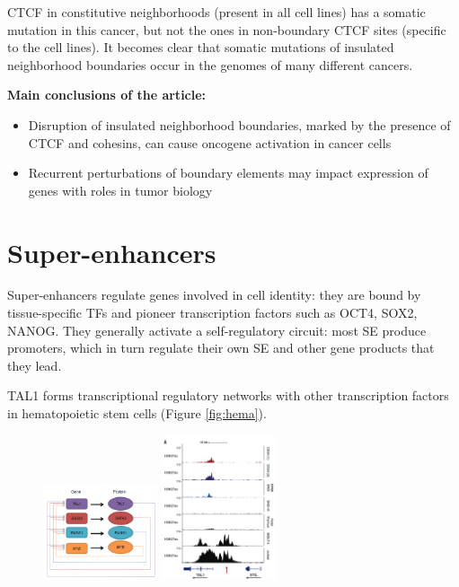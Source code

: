 CTCF in constitutive neighborhoods (present in all cell lines) has a somatic mutation in this cancer, but not the ones in non-boundary CTCF sites (specific to the cell lines). It becomes clear that somatic mutations of insulated neighborhood boundaries occur in the genomes of many different cancers.

\textbf{Main conclusions of the article:}
\begin{itemize}
\item Disruption of insulated neighborhood boundaries, marked by the presence of CTCF and cohesins,
can cause oncogene activation in cancer cells
\item Recurrent perturbations of boundary elements may impact expression of genes with roles in
tumor biology
\end{itemize}

\hypertarget{super-enhancers}{%
\section{Super-enhancers}\label{super-enhancers}}

Super-enhancers regulate genes involved in cell identity: they are bound by tissue-specific TFs and pioneer transcription factors such as OCT4, SOX2, NANOG. They generally activate a self-regulatory circuit: most SE produce promoters, which in turn regulate their own SE and other gene products that they lead.

TAL1 forms transcriptional regulatory networks with other transcription factors in hematopoietic stem cells (Figure \ref{fig:hema}).

\begin{figure}[!htb]
   \begin{minipage}{0.48\textwidth}
     \centering
     \includegraphics[width=0.3\textwidth]{../_resources/99fbd93b812d482263d53c442698a36a.png}
\caption{}
\label{fig:hema}
   \end{minipage}\hfill
   \begin{minipage}{0.48\textwidth}
     \centering
     \includegraphics[width=0.3\textwidth]{../_resources/c099d4a9ad4bba13e7839f48fd831265.png}
\caption{}
\label{fig:talju}
   \end{minipage}
\end{figure}


